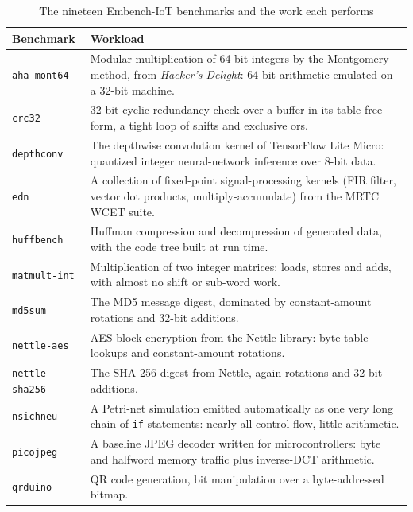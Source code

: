 \begin{table}[htb]
\centering
\caption{The nineteen Embench-IoT benchmarks and the work each performs}
\label{tab:embench-what}
\begin{tabular}{@{}lp{10.2cm}@{}}
\toprule
\textbf{Benchmark} & \textbf{Workload} \\
\midrule
\texttt{aha-mont64}     & Modular multiplication of 64-bit integers by the Montgomery method, from
                          \textit{Hacker's Delight}: 64-bit arithmetic emulated on a 32-bit machine. \\
\texttt{crc32}          & 32-bit cyclic redundancy check over a buffer in its table-free form, a tight
                          loop of shifts and exclusive ors. \\
\texttt{depthconv}      & The depthwise convolution kernel of TensorFlow Lite Micro: quantized integer
                          neural-network inference over 8-bit data. \\
\texttt{edn}            & A collection of fixed-point signal-processing kernels (FIR filter, vector dot
                          products, multiply-accumulate) from the MRTC WCET suite. \\
\texttt{huffbench}      & Huffman compression and decompression of generated data, with the code tree
                          built at run time. \\
\texttt{matmult-int}    & Multiplication of two integer matrices: loads, stores and adds, with almost
                          no shift or sub-word work. \\
\texttt{md5sum}         & The MD5 message digest, dominated by constant-amount rotations and 32-bit
                          additions. \\
\texttt{nettle-aes}     & AES block encryption from the Nettle library: byte-table lookups and
                          constant-amount rotations. \\
\texttt{nettle-sha256}  & The SHA-256 digest from Nettle, again rotations and 32-bit additions. \\
\texttt{nsichneu}       & A Petri-net simulation emitted automatically as one very long chain of
                          \texttt{if} statements: nearly all control flow, little arithmetic. \\
\texttt{picojpeg}       & A baseline JPEG decoder written for microcontrollers: byte and halfword
                          memory traffic plus inverse-DCT arithmetic. \\
\texttt{qrduino}        & QR code generation, bit manipulation over a byte-addressed bitmap. \\

\end{tabular}
\end{table}
